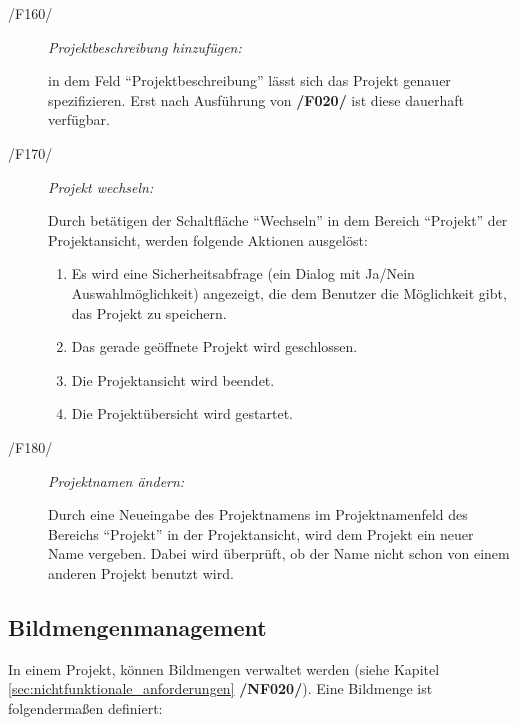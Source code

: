 \begin{description}
\begin{enumerate}
			\end{enumerate}
	
		\item[/F160/] \textit{Projektbeschreibung hinzufügen:}\par in dem Feld "`Projektbeschreibung"' lässt sich das Projekt genauer spezifizieren. Erst nach Ausführung von \textbf{/F020/} ist diese dauerhaft verfügbar.
	
		\item[/F170/] \textit{Projekt wechseln:}\par Durch betätigen der Schaltfläche "`Wechseln"' in dem Bereich "`Projekt"' der Projektansicht, werden folgende Aktionen ausgelöst:
		
		\begin{enumerate}
				
				\item Es wird eine Sicherheitsabfrage (ein Dialog mit Ja/Nein Auswahlmöglichkeit) angezeigt, die dem Benutzer die Möglichkeit gibt, das Projekt zu speichern.
				
				\item Das gerade geöffnete Projekt wird geschlossen.
				
				\item Die Projektansicht wird beendet.
				
				\item Die Projektübersicht wird gestartet.
			
			\end{enumerate}

		\item[/F180/] \textit{Projektnamen ändern:}\par Durch eine Neueingabe des Projektnamens im Projektnamenfeld des Bereichs "`Projekt"' in der Projektansicht, wird dem Projekt ein neuer Name vergeben. Dabei wird überprüft, ob der Name nicht schon von einem anderen Projekt benutzt wird.
	
	\end{description}

\subsection{Bildmengenmanagement}

\label{subsec:bildmengenmgmt}
	
	In einem Projekt, können Bildmengen verwaltet werden (siehe Kapitel \ref{sec:nichtfunktionale_anforderungen} \textbf{/NF020/}). Eine Bildmenge ist folgendermaßen definiert:
	
